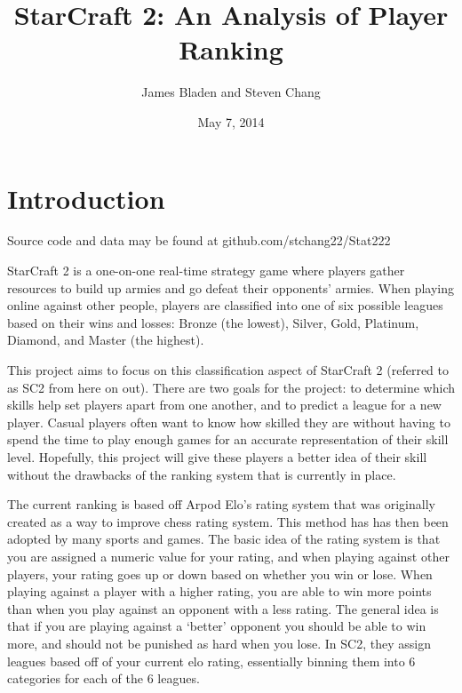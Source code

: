 \documentclass[letterpaper,10pt,english]{/usr/share/sphinx/texinputs/sphinxhowto}
\title{StarCraft 2: An Analysis of Player Ranking}
\date{May 7, 2014}
\author{James Bladen and Steven Chang}
\begin{document}
        
            \maketitle
        

        


        
        \part{Introduction}Source code and data may be found at github.com/stchang22/Stat222

StarCraft 2 is a one-on-one real-time strategy game where players gather
resources to build up armies and go defeat their opponents' armies. When
playing online against other people, players are classified into one of
six possible leagues based on their wins and losses: Bronze (the
lowest), Silver, Gold, Platinum, Diamond, and Master (the highest).

This project aims to focus on this classification aspect of StarCraft 2
(referred to as SC2 from here on out). There are two goals for the
project: to determine which skills help set players apart from one
another, and to predict a league for a new player. Casual players often
want to know how skilled they are without having to spend the time to
play enough games for an accurate representation of their skill level.
Hopefully, this project will give these players a better idea of their
skill without the drawbacks of the ranking system that is currently in
place.

The current ranking is based off Arpod Elo's rating system that was
originally created as a way to improve chess rating system. This method
has has then been adopted by many sports and games. The basic idea of
the rating system is that you are assigned a numeric value for your
rating, and when playing against other players, your rating goes up or
down based on whether you win or lose. When playing against a player
with a higher rating, you are able to win more points than when you play
against an opponent with a less rating. The general idea is that if you
are playing against a `better' opponent you should be able to win more,
and should not be punished as hard when you lose. In SC2, they assign
leagues based off of your current elo rating, essentially binning them
into 6 categories for each of the 6 leagues.
\end{document}
